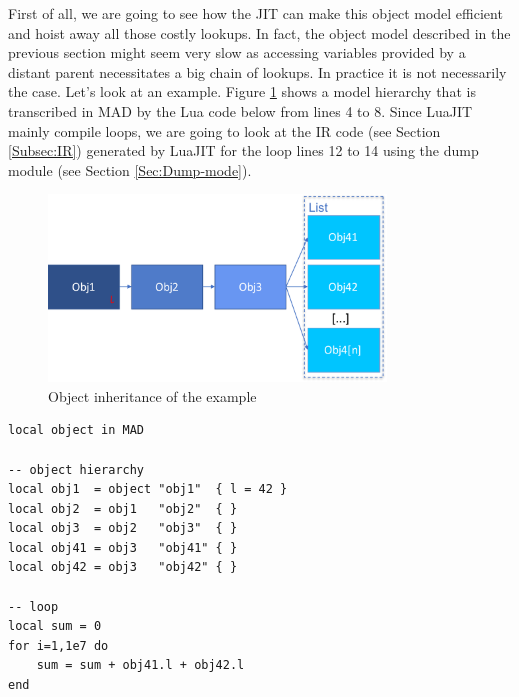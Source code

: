 
First of all, we are going to see how the JIT can make this object model
efficient and hoist away  all those costly lookups. In fact, the object model
described in the previous section might seem very slow as accessing variables
provided by a distant parent necessitates a big chain of lookups. In practice it
is not necessarily the case. Let's look at an example. Figure \ref{fig:MO-ex}
shows a model hierarchy that is transcribed in MAD by the Lua code below from
lines 4 to 8. Since LuaJIT mainly compile loops, we are going to look at the IR
code (see Section \ref{Subsec:IR}) generated by LuaJIT for the loop lines 12 to 14
using the dump module (see Section \ref{Sec:Dump-mode}).

\begin{figure}[H]
    \centering
    \includegraphics[width=0.8\textwidth]{./Images/MO-ex.pdf}
    \caption{Object inheritance of the example}
    \label{fig:MO-ex}
\end{figure}

\begin{lstlisting}[style=LuaStyle]
local object in MAD

-- object hierarchy
local obj1  = object "obj1"  { l = 42 }
local obj2  = obj1   "obj2"  { }
local obj3  = obj2   "obj3"  { }
local obj41 = obj3   "obj41" { }
local obj42 = obj3   "obj42" { }

-- loop
local sum = 0
for i=1,1e7 do
	sum = sum + obj41.l + obj42.l
end
\end{lstlisting}

